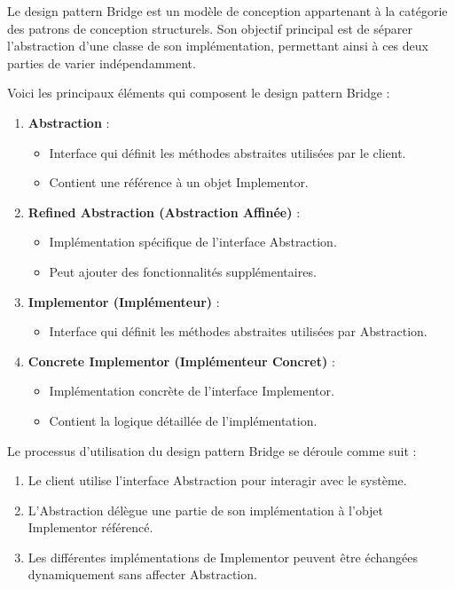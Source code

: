 Le design pattern Bridge est un modèle de conception appartenant à la catégorie des patrons de conception structurels. Son objectif principal est de séparer l'abstraction d'une classe de son implémentation, permettant ainsi à ces deux parties de varier indépendamment.

Voici les principaux éléments qui composent le design pattern Bridge :

\begin{enumerate}[leftmargin=*,labelsep=3mm]
    \item \textbf{Abstraction} :
    \begin{itemize}
        \item Interface qui définit les méthodes abstraites utilisées par le client.
        \item Contient une référence à un objet Implementor.
    \end{itemize}
    
    \item \textbf{Refined Abstraction (Abstraction Affinée)} :
    \begin{itemize}
        \item Implémentation spécifique de l'interface Abstraction.
        \item Peut ajouter des fonctionnalités supplémentaires.
    \end{itemize}
    
    \item \textbf{Implementor (Implémenteur)} :
    \begin{itemize}
        \item Interface qui définit les méthodes abstraites utilisées par Abstraction.
    \end{itemize}
    
    \item \textbf{Concrete Implementor (Implémenteur Concret)} :
    \begin{itemize}
        \item Implémentation concrète de l'interface Implementor.
        \item Contient la logique détaillée de l'implémentation.
    \end{itemize}
\end{enumerate}

Le processus d'utilisation du design pattern Bridge se déroule comme suit :

\begin{enumerate}[leftmargin=*,labelsep=3mm]
    \item Le client utilise l'interface Abstraction pour interagir avec le système.
    \item L'Abstraction délègue une partie de son implémentation à l'objet Implementor référencé.
    \item Les différentes implémentations de Implementor peuvent être échangées dynamiquement sans affecter Abstraction.
\end{enumerate}

